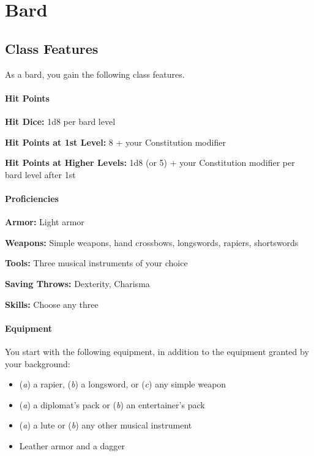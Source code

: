\documentclass[
]{article}
\date{}
\providecommand{\tightlist}{%
  \setlength{\itemsep}{0pt}\setlength{\parskip}{0pt}}
\begin{document}
\hypertarget{bard}{%
\section{Bard}\label{bard}}

\hypertarget{class-features}{%
\subsection{Class Features}\label{class-features}}

As a bard, you gain the following class features.

\hypertarget{hit-points}{%
\paragraph{Hit Points}\label{hit-points}}

\textbf{Hit Dice:} 1d8 per bard level

\textbf{Hit Points at 1st Level:} 8 + your Constitution modifier

\textbf{Hit Points at Higher Levels:} 1d8 (or 5) + your Constitution
modifier per bard level after 1st

\hypertarget{proficiencies}{%
\paragraph{Proficiencies}\label{proficiencies}}

\textbf{Armor:} Light armor

\textbf{Weapons:} Simple weapons, hand crossbows, longswords, rapiers,
shortswords

\textbf{Tools:} Three musical instruments of your choice

\textbf{Saving Throws:} Dexterity, Charisma

\textbf{Skills:} Choose any three

\hypertarget{equipment}{%
\paragraph{Equipment}\label{equipment}}

You start with the following equipment, in addition to the equipment
granted by your background:

\begin{itemize}
\tightlist
\item
  (\emph{a}) a rapier, (\emph{b}) a longsword, or (\emph{c}) any simple
  weapon
\item
  (\emph{a}) a diplomat's pack or (\emph{b}) an entertainer's pack
\item
  (\emph{a}) a lute or (\emph{b}) any other musical instrument
\item
  Leather armor and a dagger
\end{itemize}
\end{document}
